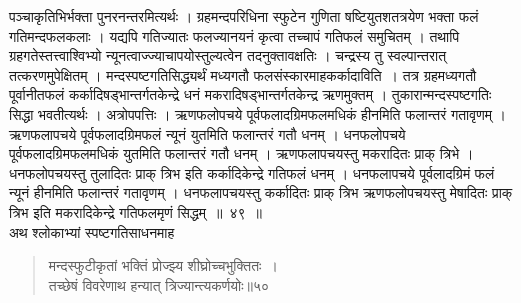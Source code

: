 \documentclass[11pt, openany]{book}
\begin{document}
\begin{sloppypar}
\noindent पञ्चाकृतिभिर्भक्ता पुनरनन्तरमित्यर्थः । ग्रहमन्दपरिधिना स्फुटेन गुणिता षष्टियुतशतत्रयेण भक्ता फलं गतिमन्दफलकलाः । यद्यपि गतिज्यातः फलज्यानयनं कृत्वा तच्चापं गतिफलं समुचितम् । तथापि ग्रहगतेस्तत्त्वाश्विभ्यो न्यूनत्वाज्ज्याचापयोस्तुल्यत्वेन तदनुक्तावक्षतिः । चन्द्रस्य तु स्वल्पान्तरात् तत्करणमुपेक्षितम् । मन्दस्पष्टगतिसिद्ध्यर्थं मध्यगतौ फलसंस्कारमाह\textendash कर्कादाविति~। तत्र ग्रहमध्यगतौ पूर्वानीतफलं कर्कादिषड्भान्तर्गतकेन्द्रे धनं मकरादिषड्भान्तर्गतकेन्द्र ऋणमुक्तम् । तुकारान्मन्दस्पष्टगतिः सिद्धा भवतीत्यर्थः । अत्रोपपत्तिः । ऋणफलोपचये पूर्वफलादग्रिमफलमधिकं हीनमिति फलान्तरं गतावृणम् । ऋणफलापचये पूर्वफलादग्रिमफलं न्यूनं युतमिति फलान्तरं गतौ धनम् । धनफलोपचये पूर्वफलादग्रिमफलमधिकं युतमिति फलान्तरं गतौ धनम् । ऋणफलापचयस्तु मकरादितः प्राक् त्रिभे । धनफलोपचयस्तु तुलादितः प्राक् त्रिभ इति कर्कादिकेन्द्रे गतिफलं धनम् । धनफलापचये पूर्वलादग्रिमं फलं न्यूनं हीनमिति फलान्तरं गतावृणम् । धनफलापचयस्तु कर्कादितः प्राक् त्रिभ ऋणफलोपचयस्तु मेषादितः प्राक् त्रिभ इति मकरादिकेन्द्रे गतिफलमृणं सिद्धम्~॥~४९~॥\\
 अथ श्लोकाभ्यां स्पष्टगतिसाधनमाह\textendash
\end{sloppypar}
\begin{quote}

{\ssi मन्दस्फुटीकृतां भक्तिं प्रोज्झ्य शीघ्रोच्चभुक्तितः~।\\
तच्छेषं विवरेणाथ हन्यात् त्रिज्यान्त्यकर्णयोः॥५०}
\end{quote}


\newpage
\end{document}
